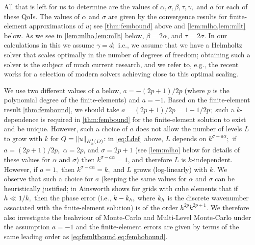     All that is left for us to determine are the values of $\alpha, \sigma, \beta, \tau, \gamma,$ and $a$ for each of these QoIs. The values of $\alpha$ and $\sigma$ are given by the convergence results for finite-element approximations of $u$; see \cref{thm:fembound} above and \cref{lem:mlho,lem:mllt} below. As we see in \cref{lem:mlho,lem:mllt} below, $\beta = 2\alpha$, and $\tau = 2\sigma$. In our calculations in this  we assume $\gamma = d;$ i.e., we assume that we have a Helmholtz solver that scales optimally in the number of degrees of freedom; obtaining such a solver is the subject of much current research, and we refer to, e.g., the recent works \cite{GrSpVa:17,ZeScHeDe:19,TaZeHeDe:19} for a selection of modern solvers achieving close to this optimal scaling.

We use two different values of $a$ below, $a=-(2p+1)/2p$ (where $p$ is the polynomial degree of the finite-elements) and $a=-1$. Based on the finite-element result \cref{thm:fembound}, we should take $a=(2p+1)/2p = 1 + 1/2p;$ such a $k$-dependence is required in \cref{thm:fembound} for the finite-element solution to exist and be unique. However, such a choice of $a$ does not allow the number of levels $L$ to grow with $k$ for $Q = \NHokD{u}$: in \cref{eq:Ldef} above, $L$ depends on $k^{\sigma-a\alpha};$ if $a=(2p+1)/2p,$ $\alpha = 2p$, and $\sigma = 2p+1$ (see \cref{lem:mlho} below for details of these values for $\alpha$ and $\sigma$) then $k^{\sigma-a\alpha} = 1$, and therefore $L$ is $k$-independent. However, if $a = 1,$ then $k^{\sigma-a\alpha} = k,$ and $L$ grows (log-linearly) with $k$. We observe that such a choice for $a$ (keeping the same values for $\alpha$ and $\sigma$ can be heuristically justified; in \cite[Theorem 3.2]{Ai:04} Ainsworth shows for grids with cube elements that if $h \ll 1/k,$ then the phase error (i.e., $k-k_{h},$ where $k_{h}$ is the discrete wavenumber associated with the finite-element solution) is of the order $h^{2p}k^{2p+1}$. We therefore also investigate the beahviour of Monte-Carlo and Multi-Level Monte-Carlo under the assumption $a=-1$ and the finite-element errors are given by terms of the same leading order as \cref{eq:femltbound,eq:femhobound}.

